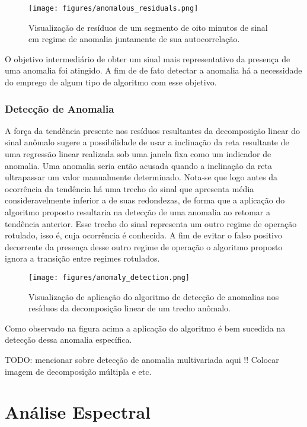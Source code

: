 \begin{figure}[H]
    \centering
    \texttt{[image: figures/anomalous\_residuals.png]}
    \caption{Visualização de resíduos de um segmento de oito minutos de sinal
    em regime de anomalia juntamente de sua autocorrelação.}
    \label{fig:anomalous_residue}
\end{figure}

O objetivo intermediário de obter um sinal mais representativo da presença de
uma anomalia foi atingido. A fim de de fato detectar a anomalia há a
necessidade do emprego de algum tipo de algoritmo com esse objetivo.

\subsubsection{Detecção de Anomalia}\label{ssec:algorithm}

A força da tendência presente nos resíduos resultantes da decomposição linear
do sinal anômalo sugere a possibilidade de usar a inclinação da reta resultante
de uma regressão linear realizada sob uma janela fixa como um indicador de
anomalia. Uma anomalia seria então acusada quando a inclinação da reta
ultrapassar um valor manualmente determinado. Nota-se que logo antes da
ocorrência da tendência há uma trecho do sinal que apresenta média
consideravelmente inferior a de suas redondezas, de forma que a aplicação do
algoritmo proposto resultaria na detecção de uma anomalia ao retomar a
tendência anterior. Esse trecho do sinal representa um outro regime de operação
rotulado, isso é, cuja ocorrência é conhecida. A fim de evitar o falso positivo
decorrente da presença desse outro regime de operação o algoritmo proposto
ignora a transição entre regimes rotulados.

\begin{figure}[H]
    \centering
    \texttt{[image: figures/anomaly\_detection.png]}
    \caption{Visualização de aplicação do algoritmo de detecção de anomalias
    nos resíduos da decomposição linear de um trecho anômalo.}
    \label{fig:normal_residue}
\end{figure}

Como observado na figura acima a aplicação do algoritmo é bem sucedida na
detecção dessa anomalia específica.

TODO: mencionar sobre detecção de anomalia multivariada aqui !! Colocar imagem
de decomposição múltipla e etc.

\section{Análise Espectral}

